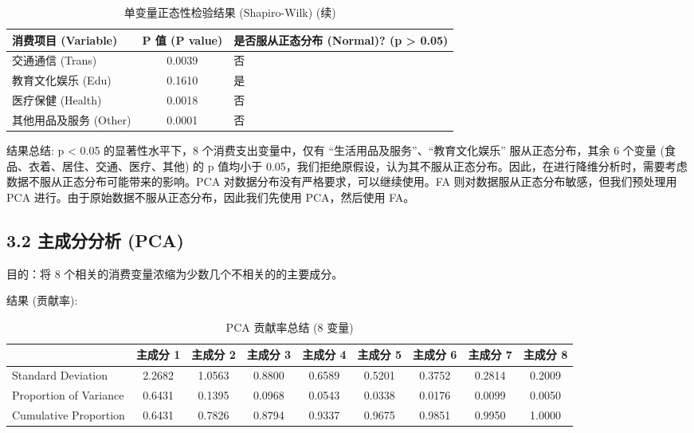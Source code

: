 \documentclass[12pt, a4paper]{article}
\begin{document}
\begin{table}[H]
    \centering
    \caption{单变量正态性检验结果 (Shapiro-Wilk) (续)}
    \label{tab:shapiro_wilk_2}
    \begin{tabularx}{\textwidth}{X|c|X}
        \toprule
        \textbf{消费项目 (Variable)} & \textbf{P 值 (P value)} & \textbf{是否服从正态分布 (Normal)? (p > 0.05)} \\
        \midrule
        交通通信 (Trans) & 0.0039 & 否 \\
        教育文化娱乐 (Edu) & 0.1610 & 是 \\
        医疗保健 (Health) & 0.0018 & 否 \\
        其他用品及服务 (Other) & 0.0001 & 否 \\
        \bottomrule
    \end{tabularx}
\end{table}

\noindent 结果总结: p < 0.05 的显著性水平下，8 个消费支出变量中，仅有 “生活用品及服务”、“教育文化娱乐” 服从正态分布，其余 6 个变量 (食品、衣着、居住、交通、医疗、其他) 的 p 值均小于 0.05，我们拒绝原假设，认为其不服从正态分布。因此，在进行降维分析时，需要考虑数据不服从正态分布可能带来的影响。PCA 对数据分布没有严格要求，可以继续使用。FA 则对数据服从正态分布敏感，但我们预处理用 PCA 进行。由于原始数据不服从正态分布，因此我们先使用 PCA，然后使用 FA。

\subsection*{3.2 主成分分析 (PCA)}
\noindent 目的：将 8 个相关的消费变量浓缩为少数几个不相关的的主要成分。

\noindent 结果 (贡献率):
\begin{table}[H]
    \centering
    \caption{PCA 贡献率总结 (8 变量)}
    \label{tab:pca_contribution}
    \begin{tabularx}{\textwidth}{X|*{8}{c}} %
        \toprule
        & \textbf{主成分 1} & \textbf{主成分 2} & \textbf{主成分 3} & \textbf{主成分 4} & \textbf{主成分 5} & \textbf{主成分 6} & \textbf{主成分 7} & \textbf{主成分 8} \\
        \midrule
        Standard Deviation & 2.2682 & 1.0563 & 0.8800 & 0.6589 & 0.5201 & 0.3752 & 0.2814 & 0.2009 \\
        Proportion of Variance & 0.6431 & 0.1395 & 0.0968 & 0.0543 & 0.0338 & 0.0176 & 0.0099 & 0.0050 \\
        Cumulative Proportion & 0.6431 & 0.7826 & 0.8794 & 0.9337 & 0.9675 & 0.9851 & 0.9950 & 1.0000 \\
        \bottomrule
    \end{tabularx}
\end{table}
\end{document}
